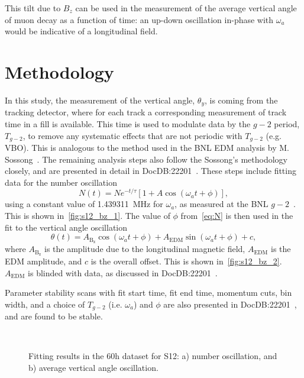 \documentclass[12pt]{article}
\begin{document}
This tilt due to $B_z$ can be used in the measurement of the average vertical angle of muon decay as a function of time: an up-down oscillation in-phase with $\omega_a$ would be indicative of a longitudinal field.

\clearpage
\thispagestyle{plain}

\section{Methodology}
In this study, the measurement of the vertical angle, $\theta_y$, is coming from the tracking detector, where for each track a corresponding measurement of track time in a fill is available. This time is used to modulate data by the $g-2$ period, $T_{g-2}$, to remove any systematic effects that are not periodic with $T_{g-2}$ (e.g. VBO). This is analogous to the method used in the BNL EDM analysis by M. Sossong~\cite{Sossong}. The remaining analysis steps also follow the Sossong's methodology closely, and are presented in detail in DocDB:22201~\cite{Gleb_docdb}. These steps include fitting data for the number oscillation
\begin{equation}
     N(t)=Ne^{-t/\tau}[1+A\cos(\omega_at+\phi)],
     \label{eq:N}
\end{equation}
using a constant value of \SI{1.439311}{\MHz} for $\omega_a$, as measured at the BNL $g-2$~\cite{BNL_AMM}. This is shown in~\cref{fig:s12_bz_1}. The value of $\phi$ from~\cref{eq:N} is then used in the fit to the vertical angle oscillation
\begin{equation}
    \theta(t) =  A_{\mathrm{B_z}}\cos(\omega_a t + \phi) + A_{\mathrm{EDM}}\sin(\omega_a t + \phi) + c,
\end{equation}
where $A_{\mathrm{B_z}}$ is the amplitude due to the longitudinal magnetic field, $A_{\mathrm{EDM}}$ is the EDM amplitude, and $c$ is the overall offset. This is shown in~\cref{fig:s12_bz_2}. $A_{\mathrm{EDM}}$ is blinded with data, as discussed in DocDB:22201~\cite{Gleb_docdb}.

Parameter stability scans with fit start time, fit end time, momentum cuts, bin width, and a choice of $T_{g-2}$ (i.e. $\omega_a$) and $\phi$ are also presented in DocDB:22201~\cite{Gleb_docdb}, and are found to be stable.
\clearpage
\thispagestyle{plain} 

\begin{figure}[htpb]
    \centering
     \\ 
    \vspace{-0.2cm}
    \caption{Fitting results in the 60h dataset for S12: a) number oscillation, and b) average vertical angle oscillation.}
    \label{fig:s12_bz}
\end{figure}
\end{document}
